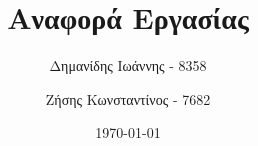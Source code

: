 

\subject{Ευφυή Συστήματα Ρομπότ}
\title{Αναφορά Εργασίας}
\author{%
	Δημανίδης Ιωάννης - 8358
  \and Ζήσης Κωνσταντίνος - 7682
}
\date{\vspace{10cm}\today}


	\pagestyle{empty}

	\maketitle

	\clearpage


	\clearpage
	\pagestyle{scrheadings}
	\setcounter{page}{1}

	
	
	
	


